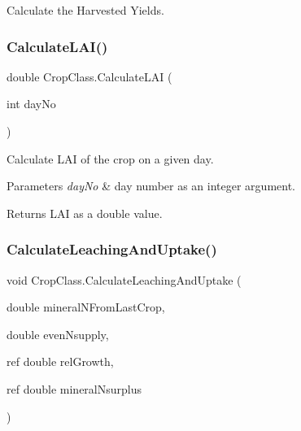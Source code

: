 Calculate the Harvested Yields. 

\mbox{\label{class_crop_class_a326d0d9193c44baa7e949bdcec4c352d}} 
\subsubsection{\texorpdfstring{CalculateLAI()}{CalculateLAI()}}
{\footnotesize\ttfamily double Crop\+Class.\+Calculate\+L\+AI (\begin{DoxyParamCaption}\item[{int}]{day\+No }\end{DoxyParamCaption})\hspace{0.3cm}{\ttfamily [inline]}}



Calculate L\+AI of the crop on a given day. 


\begin{DoxyParams}{Parameters}
{\em day\+No} & day number as an integer argument. \\
\hline
\end{DoxyParams}
\begin{DoxyReturn}{Returns}
L\+AI as a double value. 
\end{DoxyReturn}
\mbox{\label{class_crop_class_ae0e4325ab32156542dbdc53a9ccb427b}} 
\subsubsection{\texorpdfstring{CalculateLeachingAndUptake()}{CalculateLeachingAndUptake()}}
{\footnotesize\ttfamily void Crop\+Class.\+Calculate\+Leaching\+And\+Uptake (\begin{DoxyParamCaption}\item[{double}]{mineral\+N\+From\+Last\+Crop,  }\item[{double}]{even\+Nsupply,  }\item[{ref double}]{rel\+Growth,  }\item[{ref double}]{mineral\+Nsurplus }\end{DoxyParamCaption})\hspace{0.3cm}{\ttfamily [inline]}}



